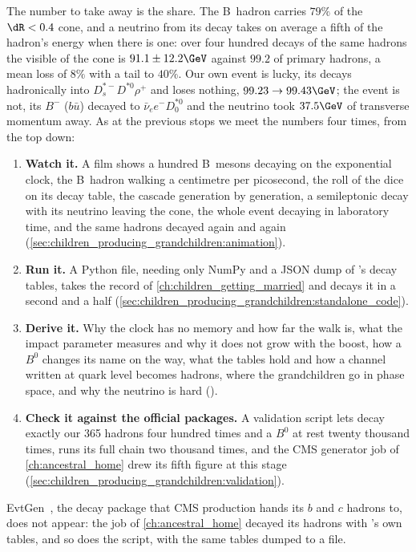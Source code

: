 The number to take away is the share. The B~hadron carries $79\%$ of the
$\dR<0.4$ cone, and a neutrino from its decay takes on average a fifth of
the hadron's energy when there is one: over four hundred decays of the same
hadrons the visible \pt of the cone is $91.1\pm12.2\GeV$ against $99.2$ of
primary hadrons, a mean loss of $8\%$ with a tail to $40\%$. Our own event
is lucky, its \Bbar decays hadronically into $D_s^{*-}D^{*0}\rho^+$ and
loses nothing, $99.23\to99.43\GeV$; the \CMSSW event is not, its $B^-$
($b\bar u$) decayed to $\bar\nu_e e^-D_0^{*0}$ and the neutrino took
$37.5\GeV$ of transverse momentum away. As at the previous stops we meet the
numbers four times, from the top down:
\begin{enumerate}[nosep]
  \item \textbf{Watch it.} A film shows a hundred B~mesons decaying on the
    exponential clock, the B~hadron walking a centimetre per picosecond,
    the roll of the dice on its decay table, the cascade generation by
    generation, a semileptonic decay with its neutrino leaving the cone, the
    whole event decaying in laboratory time, and the same hadrons decayed
    again and again (\cref{sec:children_producing_grandchildren:animation}).
  \item \textbf{Run it.} A Python file, needing only NumPy and a JSON dump of
    \PYTHIA's decay tables, takes the record of
    \cref{ch:children_getting_married} and decays it in a second and a half
    (\cref{sec:children_producing_grandchildren:standalone_code}).
  \item \textbf{Derive it.} Why the clock has no memory and how far the walk
    is, what the impact parameter measures and why it does not grow with
    the boost, how a $B^0$ changes its name on the way, what the tables
    hold and how a channel written at quark level becomes hadrons, where
    the grandchildren go in phase space, and why the neutrino is hard
    ().
  \item \textbf{Check it against the official packages.} A validation script
    lets \PYTHIA decay exactly our 365 hadrons four hundred times and a
    $B^0$ at rest twenty thousand times, runs its full chain two thousand
    times, and the CMS generator job of \cref{ch:ancestral_home} drew its
    fifth figure at this stage
    (\cref{sec:children_producing_grandchildren:validation}).
\end{enumerate}
EvtGen~\cite{Lange:2001uf}, the decay package that CMS production hands its
$b$ and $c$ hadrons to, does not appear: the \CMSSW job of
\cref{ch:ancestral_home} decayed its hadrons with \PYTHIA's own tables, and
so does the script, with the same tables dumped to a file.

